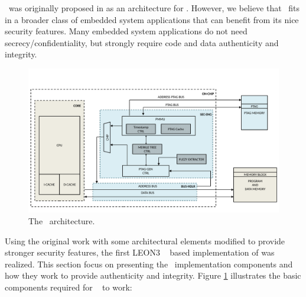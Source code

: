 \cshia~was originally proposed in \cite{Hoffman2015} as an architecture for \iot. However, we believe that \cshia~fits in a broader class of embedded system applications that can benefit from its nice security features. Many embedded system applications do not need secrecy\slash{}confidentiality, but strongly require code and data authenticity and integrity. 
\begin{figure}[!ht]
    \centering
    \includegraphics[width=\textwidth]{figures/pdf/CSHIA_detailed_caio_expansion.pdf}
    \caption{The \cshia~architecture.}
    \label{fig:cshia}
\end{figure}
Using the original work with some architectural elements modified to provide stronger security features, the first LEON3 \fpga~ based implementation of \cshia was realized. This section focus on presenting the \cshia~implementation components and how they work to provide authenticity and integrity. Figure \ref{fig:cshia} illustrates the basic components required for \cshia~ to work: 
